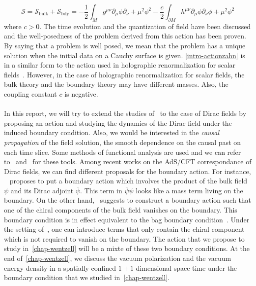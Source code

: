 \begin{equation}\label{intro-actionzahn}
\mathcal{S} = \mathcal{S}_{\mathrm{bulk}} + \mathcal{S}_{\mathrm{bdy}} = 
-\frac 1 2 \int_M g^{\mu\nu} \partial_\mu \phi \partial_{\nu} + 
\mu^2\phi^2 - \frac c 2 \int_{\partial M}h^{\mu\nu}\partial_\mu\phi\partial_\nu\phi + \mu^2\phi^2
\end{equation}
where $c>0$.
The time evolution and the quantization of field have been discussed and the well-posedness of the problem derived from this action has been proven.
By saying that a problem is well posed, we mean that the problem has a unique solution when the initial data on a Cauchy surface is given.
\cref{intro-actionzahn} is in a similar form to the action used in holographic renormalization for scalar fields~\cite{Skenderis2002}. 
However, in the case of holographic renormalization for scalar fields, the bulk theory and the boundary theory may have different masses.
Also, the coupling constant $c$ is negative. \\\\
%
In this report, we will try to extend the studies of~\cite{Zahn2016} to the case of Dirac fields by proposing an action and studying the dynamics of the Dirac field under the induced boundary condition.
Also, we would be interested in the \textit{causal propagation} of the field solution, \ie the smooth dependence on the causal past on each time slice.
Some methods of functional analysis are used and we can refer to~\cite{Reed1981} and~\cite{Reed1975} for these tools. 
%
Among recent works on the AdS/CFT correspondance of Dirac fields, we can find different proposals for the boundary action.
For instance, 
~\cite{Henningson1998} proposes to put a boundary action which involves the product of the bulk field $\psi$ and its Dirac adjoint $\bar{\psi}$. 
This term in $\bar{\psi}\psi$ looks like a mass term living on the boundary.
On the other hand,~\cite{Contino2005} suggests to construct a boundary action such that one of the chiral components of the bulk field vanishes on the boundary.
This boundary condition is in effect equivalent to the bag boundary condition~\cite{Chodos1974}.
Under the setting of~\cite{Contino2005}, one can introduce terms that only contain the chiral component which is not required to vanish on the boundary.
The action that we propose to study in~\cref{chap-wentzell} will be a mixte of these two boundary conditions.
At the end of~\cref{chap-wentzell}, we discuss the vacuum polarization and the vacuum energy density in a spatially confined $1+1$-dimensional space-time under the boundary condition that we studied in~\cref{chap-wentzell}.
